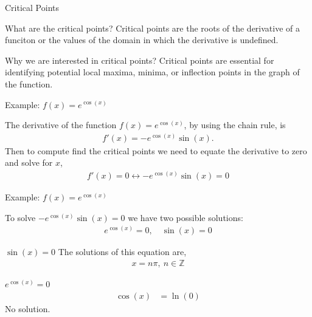 \documentclass[../tufte-style.tex]{standalone}
\begin{document}
\date{March 2, 2026}


\begin{frame}{Critical Points}

    \begin{block}{What are the critical points?}
        Critical points are the roots of the derivative of a funciton or the values of the domain in which the derivative is undefined.
    \end{block}

    \hfill

    \begin{block}{Why we are interested in critical points?}
        Critical points are essential for identifying potential local maxima, minima, or inflection points in the graph of the function. 
    \end{block}


\end{frame}

\begin{frame}{Example: \(f(x) = e^{\cos(x)}\)}

The derivative of the function \(f(x) = e^{\cos(x)}\), by using the chain rule, is 
\begin{gather*}
    f'(x) = -e^{\cos(x)}\sin(x).
\end{gather*}
Then to compute find the critical points we need to equate the derivative to zero and solve for \(x\),
\begin{gather*}
    f'(x) = 0 \leftrightarrow -e^{\cos(x)}\sin(x) = 0
\end{gather*}

\end{frame}

\begin{frame}{Example: \(f(x) = e^{\cos(x)}\)}

To solve \(-e^{\cos(x)}\sin(x) = 0\)
we have two possible solutions:
\begin{gather*}
e^{\cos(x)} = 0,\quad \sin(x) = 0
\end{gather*}

\begin{minipage}[c]{0.45\textwidth}
\begin{block}{\(\sin(x)=0\)}
    The solutions of this equation are,
    \begin{gather*}
        x= n\pi,~n\in\mathbb{Z}
    \end{gather*}
\end{block}
\end{minipage}
\hfill
\begin{minipage}[c]{0.45\textwidth}
\begin{block}{\(e^{\cos(x)}=0\)}
    \begin{align*}
        \cos(x) &= \ln(0)
    \end{align*}
    \centering
    No solution.
\end{block}
\end{minipage}

\end{frame}
\end{document}
